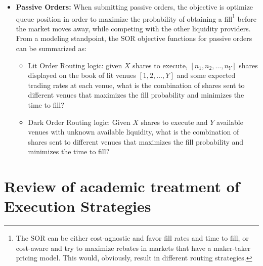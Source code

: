 \begin{itemize}
\item \textbf{Passive Orders:} When submitting passive orders, the objective is optimize queue position in order to maximize the probability of obtaining a fill\footnote{The SOR can be either cost-agnostic and favor fill rates and time to fill, or cost-aware and try to maximize rebates in markets that have a maker-taker pricing model. This would, obviously, result in different routing strategies.} before the market moves away, while competing with the other liquidity providers. From a modeling standpoint, the SOR objective functions for passive orders can be summarized as:
    \begin{itemize}
        \item Lit Order Routing logic: given $X$ shares to execute, $[n_1, n_2, \ldots, n_Y]$ shares displayed on the book of lit venues $[1, 2, \ldots, Y]$ and some expected trading rates at each venue, what is the combination of shares sent to different venues that maximizes the fill probability and minimizes the time to fill?
        \item Dark Order Routing logic: Given $X$ shares to execute and $Y$ available venues with unknown available liquidity, what is the combination of shares sent to different venues that maximizes the fill probability and minimizes the time to fill?
    \end{itemize}
\end{itemize}



\section{Review of academic treatment of Execution Strategies}


